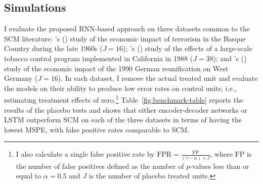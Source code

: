 \documentclass[12pt]{article}
\newcommand{\possessivecite}[1]{\citeauthor{#1}'s (\citeyear{#1})}
\begin{document}
\subsection{Simulations} \label{sims}



I evaluate the proposed RNN-based approach on three datasets common to the SCM literature: \possessivecite{abadie2003economic} study of the economic impact of terrorism in the Basque Country during the late 1960s ($J=16$); \possessivecite{abadie2010synthetic} study of the effects of a large-scale tobacco control program implemented in California in 1988 ($J=38$); and \possessivecite{abadie2015comparative} study of the economic impact of the 1990 German reunification on West Germany ($J=16$). In each dataset, I remove the actual treated unit and evaluate the models on their ability to produce low error rates on control units; i.e., estimating treatment effects of zero.\footnote{I also calculate a single false positive rate by $\text{FPR} = \frac{\text{FP}}{(\tau-n) \times J}$, where $\text{FP}$ is the number of false positives defined as the number of $p$-values less than or equal to $\alpha=0.5$ and $J$ is the number of placebo treated units.} Table~\ref{fig:benchmark-table} reports the results of the placebo tests and shows that either encoder-decoder networks or LSTM outperform SCM on each of the three datasets in terms of having the lowest MSPE, with false positive rates comparable to SCM. 
\end{document}
